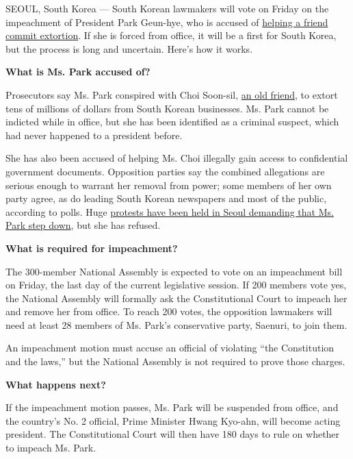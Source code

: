 SEOUL, South Korea --- South Korean lawmakers will vote on Friday on the
impeachment of President Park Geun-hye, who is accused of
\href{http://www.nytimes3xbfgragh.onion/2016/11/06/world/asia/south-koreans-ashamed-over-les-secretive-adviser.html}{helping
a friend commit extortion}. If she is forced from office, it will be a
first for South Korea, but the process is long and uncertain. Here's how
it works.

\textbf{What is Ms. Park accused of?}

Prosecutors say Ms. Park conspired with Choi Soon-sil,
\href{http://www.nytimes3xbfgragh.onion/2016/10/28/world/asia/south-korea-choi-soon-sil.html}{an
old friend}, to extort tens of millions of dollars from South Korean
businesses. Ms. Park cannot be indicted while in office, but she has
been identified as a criminal suspect, which had never happened to a
president before.

She has also been accused of helping Ms. Choi illegally gain access to
confidential government documents. Opposition parties say the combined
allegations are serious enough to warrant her removal from power; some
members of her own party agree, as do leading South Korean newspapers
and most of the public, according to polls. Huge
\href{http://www.nytimes3xbfgragh.onion/2016/11/26/world/asia/korea-park-geun-hye-protests.html}{protests
have been held in Seoul demanding that Ms. Park step down}, but she has
refused.

\textbf{What is required for impeachment?}

The 300-member National Assembly is expected to vote on an impeachment
bill on Friday, the last day of the current legislative session. If 200
members vote yes, the National Assembly will formally ask the
Constitutional Court to impeach her and remove her from office. To reach
200 votes, the opposition lawmakers will need at least 28 members of Ms.
Park's conservative party, Saenuri, to join them.

An impeachment motion must accuse an official of violating ``the
Constitution and the laws,'' but the National Assembly is not required
to prove those charges.

\textbf{What happens next?}

If the impeachment motion passes, Ms. Park will be suspended from
office, and the country's No. 2 official, Prime Minister Hwang Kyo-ahn,
will become acting president. The Constitutional Court will then have
180 days to rule on whether to impeach Ms. Park.

